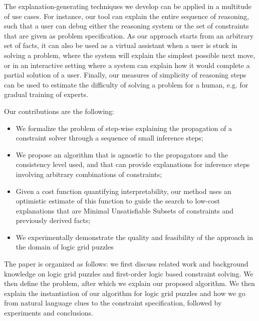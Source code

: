 The explanation-generating techniques we develop can be applied in a multitude of use cases. 
For instance, our tool can explain the entire sequence of reasoning, such that a user can debug either the reasoning system or the set of constraints that are given as problem specification. 
As our approach starts from an arbitrary set of facts, it can also be used as a virtual assistant when a user is stuck in solving a problem, where the system will explain the simplest possible next move, or in an interactive setting where a system can explain how it would complete a partial solution of a user.
Finally, our measures of simplicity of reasoning steps can be used to estimate the difficulty of solving a problem for a human, e.g. for gradual training of experts.


Our contributions are the following:
\begin{itemize}
	\item We formalize the problem of step-wise explaining the propagation of a constraint solver through a sequence of small inference steps;
	\item We propose an algorithm that is agnostic to the propagators and the consistency level used, and that can provide explanations for inference steps involving arbitrary combinations of constraints;
	\item Given a cost function quantifying interpretability, our method uses an optimistic estimate of this function to guide the search to low-cost explanations that are Minimal Unsatisfiable Subsets of constraints and previously derived facts;
	\item We experimentally demonstrate the quality and feasibility of the approach in the domain of logic grid puzzles
\end{itemize}

The paper is organized as follows: we first discuss related work and background knowledge on logic grid puzzles and first-order logic based constraint solving. We then define the problem, after which we explain our proposed algorithm. We then explain the instantiation of our algorithm for logic grid puzzles and how we go from natural language clues to the constraint specification, followed by experiments and conclusions.


